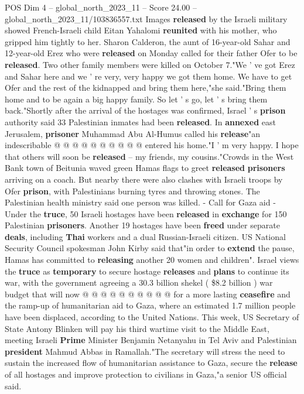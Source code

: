\begin{textsample}{POS Dim 4 – global\_north\_2023\_11 – Score 24.00 – global\_north\_2023\_11/103836557.txt}
Images \textbf{released} by the Israeli military showed French-Israeli child Eitan Yahalomi \textbf{reunited} with his mother, who gripped him tightly to her.
Sharon Calderon, the aunt of 16-year-old Sahar and 12-year-old Erez who were \textbf{released} on Monday called for their father Ofer to be \textbf{released}.
Two other family members were killed on October 7."We ' ve got Erez and Sahar here and we ' re very, very happy we got them home.
We have to get Ofer and the rest of the kidnapped and bring them here,"she said."Bring them home and to be again a big happy family.
So let ' s go, let ' s bring them back."Shortly after the arrival of the hostages was confirmed, Israel ' s \textbf{prison} authority said 33 Palestinian inmates had been \textbf{released}.
In \textbf{annexed} east Jerusalem, \textbf{prisoner} Muhammad Abu Al-Humus called his \textbf{release}"an indescribable @ @ @ @ @ @ @ @ @ @ entered his home."I ' m very happy.
I hope that others will soon be \textbf{released} -- my friends, my cousins."Crowds in the West Bank town of Beitunia waved green Hamas flags to greet \textbf{released} \textbf{prisoners} arriving on a coach.
But nearby there were also clashes with Israeli troops by Ofer \textbf{prison}, with Palestinians burning tyres and throwing stones.
The Palestinian health ministry said one person was killed. - Call for Gaza aid - Under the \textbf{truce}, 50 Israeli hostages have been \textbf{released} in \textbf{exchange} for 150 Palestinian \textbf{prisoners}.
Another 19 hostages have been \textbf{freed} under separate \textbf{deals}, including \textbf{Thai} workers and a dual Russian-Israeli citizen.
US National Security Council spokesman John Kirby said that"in order to \textbf{extend} the pause, Hamas has committed to \textbf{releasing} another 20 women and children".
Israel views the \textbf{truce} as \textbf{temporary} to secure hostage \textbf{releases} and \textbf{plans} to continue its war, with the government agreeing a 30.3 billion shekel ( \$8.2 billion ) war budget that will now @ @ @ @ @ @ @ @ @ @ for a more lasting \textbf{ceasefire} and the ramp-up of humanitarian aid to Gaza, where an estimated 1.7 million people have been displaced, according to the United Nations.
This week, US Secretary of State Antony Blinken will pay his third wartime visit to the Middle East, meeting Israeli \textbf{Prime} Minister Benjamin Netanyahu in Tel Aviv and Palestinian \textbf{president} Mahmud Abbas in Ramallah."The secretary will stress the need to sustain the increased flow of humanitarian assistance to Gaza, secure the \textbf{release} of all hostages and improve protection to civilians in Gaza,"a senior US official said.

\end{textsample}
